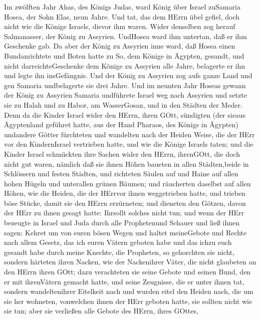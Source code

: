  Im zwölften Jahr Ahas, des Königs Judas, ward König über
Israel zuSamaria Hosea, der Sohn Elas, neun Jahre.  Und tat,
das dem HErrn übel gefiel, doch nicht wie die Könige Israels, dievor ihm
waren.  Wider denselben zog herauf Salmanasser, der König zu
Assyrien. UndHosea ward ihm untertan, daß er ihm Geschenke gab.
 Da aber der König zu Assyrien inne ward, daß Hosea einen
Bundanrichtete und Boten hatte zu So, dem Könige in Ägypten, gesandt,
und nicht darreichteGeschenke dem Könige zu Assyrien alle Jahre,
belagerte er ihn und legte ihn insGefängnis.  Und der König
zu Assyrien zog aufs ganze Land und gen Samaria undbelagerte sie drei
Jahre.  Und im neunten Jahr Hoseas gewann der König zu
Assyrien Samaria undführete Israel weg nach Assyrien und setzte sie zu
Halah und zu Habor, am WasserGosan, und in den Städten der Meder.
 Denn da die Kinder Israel wider den HErrn, ihren GOtt,
sündigten (der sieaus Ägyptenland geführet hatte, aus der Hand Pharaos,
des Königs in Ägypten) undandere Götter fürchteten  und
wandelten nach der Heiden Weise, die der HErr vor den KindernIsrael
vertrieben hatte, und wie die Könige Israels taten;  und die
Kinder Israel schmückten ihre Sachen wider den HErrn, ihrenGOtt, die
doch nicht gut waren, nämlich daß sie ihnen Höhen baueten in allen
Städten,beide in Schlössern und festen Städten,  und
richteten Säulen auf und Haine auf allen hohen Hügeln und unterallen
grünen Bäumen;  und räucherten daselbst auf allen Höhen,
wie die Heiden, die der HErrvor ihnen weggetrieben hatte, und trieben
böse Stücke, damit sie den HErrn erzürneten;  und dieneten
den Götzen, davon der HErr zu ihnen gesagt hatte: Ihrsollt solches nicht
tun;  und wenn der HErr bezeugte in Israel und Juda durch
alle Prophetenund Schauer und ließ ihnen sagen: Kehret um von euren
bösen Wegen und haltet meineGebote und Rechte nach allem Gesetz, das ich
euren Vätern geboten habe und das ichzu euch gesandt habe durch meine
Knechte, die Propheten,  so gehorchten sie nicht, sondern
härteten ihren Nacken, wie der Nackenihrer Väter, die nicht glaubeten an
den HErrn ihren GOtt;  dazu verachteten sie seine Gebote
und seinen Bund, den er mit ihrenVätern gemacht hatte, und seine
Zeugnisse, die er unter ihnen tat, sondern wandeltenihrer Eitelkeit nach
und wurden eitel den Heiden nach, die um sie her wohneten, vonwelchen
ihnen der HErr geboten hatte, sie sollten nicht wie sie tun;
 aber sie verließen alle Gebote des HErrn, ihres GOttes,
